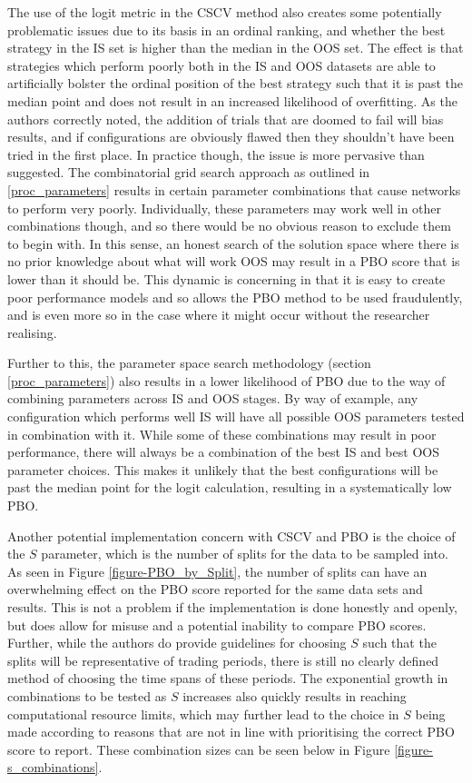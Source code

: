 \documentclass[a4paper,11pt,oneside]{article}
\theoremstyle{plain}
\theoremstyle{definition}
\begin{document}
	The use of the logit metric in the CSCV method also creates some potentially problematic issues due to its basis in an ordinal ranking, and whether the best strategy in the IS set is higher than the median in the OOS set. The effect is that strategies which perform poorly both in the IS and OOS datasets are able to artificially bolster the ordinal position of the best strategy such that it is past the median point and does not result in an increased likelihood of overfitting. As the authors correctly noted, the addition of trials that are doomed to fail will bias results, and if configurations are obviously flawed then they shouldn't have been tried in the first place. In practice though, the issue is more pervasive than suggested. The combinatorial grid search approach as outlined in \ref{proc_parameters} results in certain parameter combinations that cause networks to perform very poorly. Individually, these parameters may work well in other combinations though, and so there would be no obvious reason to exclude them to begin with. In this sense, an honest search of the solution space where there is no prior knowledge about what will work OOS may result in a PBO score that is lower than it should be. This dynamic is concerning in that it is easy to create poor performance models and so allows the PBO method to be used fraudulently, and is even more so in the case where it might occur without the researcher realising. \newline
	
	Further to this, the parameter space search methodology (section \ref{proc_parameters}) also results in a lower likelihood of PBO due to the way of combining parameters across IS and OOS stages. By way of example, any configuration which performs well IS will have all possible OOS parameters tested in combination with it. While some of these combinations may result in poor performance, there will always be a combination of the best IS and best OOS parameter choices. This makes it unlikely that the best configurations will be past the median point for the logit calculation, resulting in a systematically low PBO.\newline
	
	Another potential implementation concern with CSCV and PBO is the choice of the $S$ parameter, which is the number of splits for the data to be sampled into. As seen in Figure \ref{figure-PBO_by_Split}, the number of splits can have an overwhelming effect on the PBO score reported for the same data sets and results. This is not a problem if the implementation is done honestly and openly, but does allow for misuse and a potential inability to compare PBO scores. Further, while the authors do provide guidelines for choosing $S$ such that the splits will be representative of trading periods, there is still no clearly defined method of choosing the time spans of these periods. The exponential growth in combinations to be tested as $S$ increases also quickly results in reaching computational resource limits, which may further lead to the choice in $S$ being made according to reasons that are not in line with prioritising the correct PBO score to report. These combination sizes can be seen below in Figure \ref{figure-s_combinations}.
	
\end{document}
